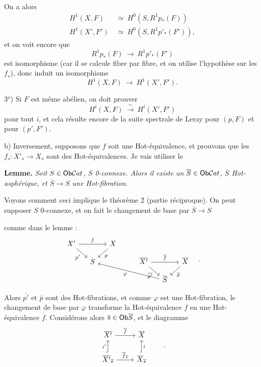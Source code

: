

On a alors
\[
\begin{aligned}
H^1(X,F) &\ \simeq\ H^0(S, R^1p_*(F)) \\
H^1(X',F') &\ \simeq\ H^0(S, R^1p'_*(F')),
\end{aligned}
\]
et on voit encore que
\[
R^1p_*(F) \ \longrightarrow\ R^1p'_*(F')
\]
est isomorphisme (car il se calcule fibre par fibre, et on utilise l'hypothèse sur les $f_s$), donc induit un isomorphisme
\[
H^1(X,F) \ \longrightarrow\ H^1(X',F').
\]

3$^{o}$) Si $F$ est même abélien, on doit prouver
\[
H^i(X,F) \ \xrightarrow{\ \sim\ }\ H^i(X',F')
\]
pour tout $i$, et cela résulte encore de la suite spectrale de Leray pour $(p,F)$ et pour $(p',F')$.

b) Inversement, supposons que $f$ soit une Hot-équivalence, et prouvons que les $f_s : X'_s \longrightarrow X_s$ sont des Hot-équivalences. Je vais utiliser le

\textbf{Lemme.} \textit{Soit $S \in \mathsf{Ob}\mathcal{C}at$, $S$ \textup{0}-connexe. Alors il existe un $\overline{S} \in \mathsf{Ob}\mathcal{C}at$, $\overline{S}$ \textup{Hot}-asphérique, et $\overline{S} \longrightarrow S$ une \textup{Hot}-fibration.}

Voyons comment ceci implique le théorème 2 (partie réciproque). On peut supposer $S$ 0-connexe, et on fait le changement de base par $\overline{S} \longrightarrow S$


comme dans le lemme :
\[
\begin{tikzcd}[column sep=small, row sep=small]
X' \arrow[rr, "f"] \arrow[dr, "p'"'] & & X \arrow[dl, "p"] & & & & \\
& S & & & \overline{X'} \arrow[rr, "\overline{f}"] \arrow[dr, "\overline{p'}"'] & & \overline{X} \arrow[dl, "\overline{p}"] \\
& & & & & \overline{S} \arrow[ullll, "\varphi"] &
\end{tikzcd}
\quad .
\]

Alors $\overline{p'}$ et $\overline{p}$ sont des Hot-fibrations, et comme $\varphi$ est une Hot-fibration, le changement de base par $\varphi$ transforme la Hot-équivalence $f$ en une Hot-équivalence $\overline{f}$. Considérons alors $\overline{s} \in \mathsf{Ob}\overline{S}$, et le diagramme
\[
\begin{tikzcd}
\overline{X'} \arrow[r, "\overline{f}"] & \overline{X} \\
\overline{X'}_{\overline{s}} \arrow[u, hook, "i'"] \arrow[r, "\overline{f}_{\overline{s}}"] & \overline{X}_{\overline{s}} \arrow[u, hook, "i"']
\end{tikzcd}
\qquad .
\]

